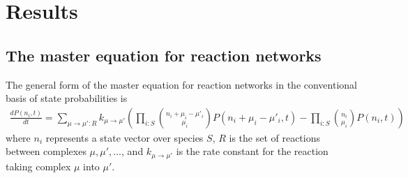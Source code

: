 \section{\label{sec:results}Results}


\subsection{The master equation for reaction networks}
The general form of the master equation for reaction networks in the conventional basis of state probabilities is
\begin{align*}
\frac{d P(n_i,t)}{dt} = \sum_{\mu \rightarrow \mu' \colon R} k_{\mu \rightarrow \mu'} \left(\prod_{i \colon S} \binom{n_i + \mu_i - \mu'_i}{\mu_i} P(n_i + \mu_i - \mu'_i,t) - \prod_{i \colon S} \binom{n_i}{\mu_i} P(n_i,t) \right)
\end{align*}
where $n_i$ represents a state vector over species $S$, $R$ is the set of reactions between complexes $\mu, \mu', \ldots$, and $k_{\mu \rightarrow \mu'}$ is the rate constant for the reaction taking complex $\mu$ into $\mu'$.


